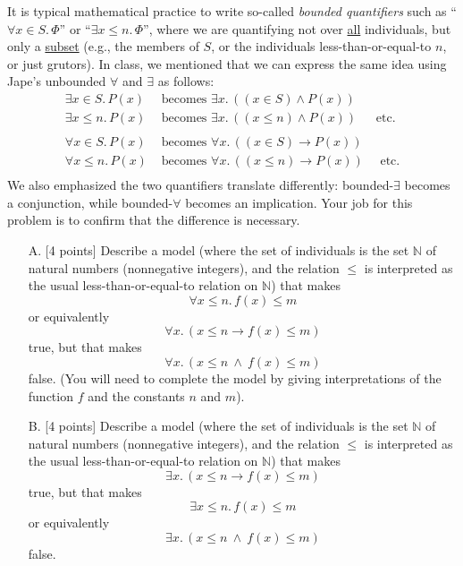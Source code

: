 \documentclass[12pt,letterpaper,boxed,cm]{hmcpset}
\newcommand{\ra}[0]{\rightarrow}
\begin{document}
\begin{problem}[3.]
    [8 points] It is typical mathematical practice to write so-called \textit{bounded quantifiers} such as ``$\forall x\in S.\,\Phi$'' or ``$\exists x\le n.\,\Phi$'', where we are quantifying not over \underline{all} individuals, but only a \underline{subset} (e.g., the members of $S$, or the individuals less-than-or-equal-to $n$, or just grutors). In class, we mentioned that we can express the same idea using Jape's unbounded $\forall$ and $\exists$ as follows:
    \begin{align*}
        \exists x\in S.\,P(x)&\text{ becomes }\exists x.\,( (x\in S) \land P(x) )\\
        \exists x\le n.\,P(x)&\text{ becomes }\exists x.\,( (x\le n) \land P(x) )~~~~~~~\text{etc.}\\\\
        \forall x\in S.\,P(x) &\text{ becomes }\forall x.\,( (x\in S) \ra P(x) )\\
        \forall x\le n.\,P(x) &\text{ becomes }\forall x.\,( (x\le n) \ra P(x) )~~~~~~\text{etc.}\\
    \end{align*}
    We also emphasized the two quantifiers translate differently: bounded-$\exists$ becomes a conjunction, while bounded-$\forall$ becomes an implication. Your job for this problem is to confirm that the difference is necessary.
    \begin{enumerate}
        \item [A.] [4 points] Describe a model (where the set of individuals is the set $\mathbb{N}$ of natural numbers (nonnegative integers), and the relation $\le$ is interpreted as the usual less-than-or-equal-to relation on $\mathbb{N}$) that makes 
        \[
            \forall x\le n.\,f(x) \le m
        \]
        or equivalently
        \[
            \forall x.\,( x\le n \ra f(x)\le m )
        \]
        true, but that makes
        \[
            \forall x.\,( x\le n ~\land~ f(x) \le m )
        \]
        false. (You will need to complete the model by giving interpretations of the function $f$ and the constants $n$ and $m$).
        \item [B.] [4 points] Describe a model (where the set of individuals is the set $\mathbb{N}$ of natural numbers (nonnegative integers), and the relation $\le$ is interpreted as the usual less-than-or-equal-to relation on $\mathbb{N}$) that makes 
        \[
            \exists x.\,( x\le n  \ra   f(x) \le m )
        \]
        true, but that makes
        \[
            \exists x\le n. \,f(x) \le m
        \]
        or equivalently
        \[
            \exists x.\,( x\le n  ~\land~  f(x)\le m )
        \]
        false.
    \end{enumerate}
\end{problem}
\end{document}
